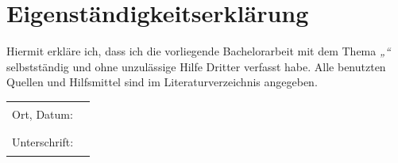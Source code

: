 \chapter*{Eigenständigkeitserklärung}
Hiermit erkläre ich, dass ich die vorliegende Bachelorarbeit mit dem Thema 
\textit{„\titel“} selbstständig und ohne unzulässige Hilfe Dritter verfasst habe.  
Alle benutzten Quellen und Hilfsmittel sind im Literaturverzeichnis angegeben.  

\vspace{2cm}
\noindent
\begin{tabular}{@{}ll}
Ort, Datum: & \rule{5cm}{0.4pt} \\
Unterschrift: & \rule{5cm}{0.4pt} \\
\end{tabular}
